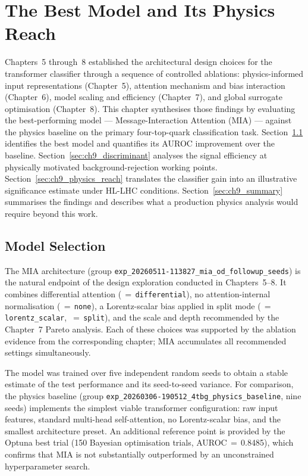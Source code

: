 \chapter{The Best Model and Its Physics Reach}
\label{ch:best_model}

Chapters~5 through~8 established the architectural design choices for the
transformer classifier through a sequence of controlled ablations: physics-informed
input representations (Chapter~5), attention mechanism and bias interaction
(Chapter~6), model scaling and efficiency (Chapter~7), and global surrogate
optimisation (Chapter~8). This chapter synthesises those findings by evaluating the
best-performing model — Message-Interaction Attention (MIA) — against the physics
baseline on the primary four-top-quark classification task. Section~\ref{sec:ch9_selection}
identifies the best model and quantifies its AUROC improvement over the baseline.
Section~\ref{sec:ch9_discriminant} analyses the signal efficiency at physically
motivated background-rejection working points. Section~\ref{sec:ch9_physics_reach}
translates the classifier gain into an illustrative significance estimate under
HL-LHC conditions. Section~\ref{sec:ch9_summary} summarises the findings and
describes what a production physics analysis would require beyond this work.

\section{Model Selection}
\label{sec:ch9_selection}

The MIA architecture (group \texttt{exp\_20260511-113827\_mia\_od\_followup\_seeds})
is the natural endpoint of the design exploration conducted in Chapters~5–8.
It combines differential attention (\,$=$\,\texttt{differential}),
no attention-internal normalisation (\,$=$\,\texttt{none}),
a Lorentz-scalar bias applied in split mode
(\,$=$\,\texttt{lorentz\_scalar}, \,$=$\,\texttt{split}),
and the scale and depth recommended by the Chapter~7 Pareto analysis. Each of these
choices was supported by the ablation evidence from the corresponding chapter; MIA
accumulates all recommended settings simultaneously.

The model was trained over five independent random seeds to obtain a stable estimate
of the test performance and its seed-to-seed variance. For comparison, the physics
baseline (group \texttt{exp\_20260306-190512\_4tbg\_physics\_baseline}, nine seeds)
implements the simplest viable transformer configuration: raw input features,
standard multi-head self-attention, no Lorentz-scalar bias, and the smallest
architecture preset. An additional reference point is provided by the Optuna
best trial (\num{150} Bayesian optimisation trials, AUROC\,$=$\,\num{0.8485}),
which confirms that MIA is not substantially outperformed by an unconstrained
hyperparameter search.

